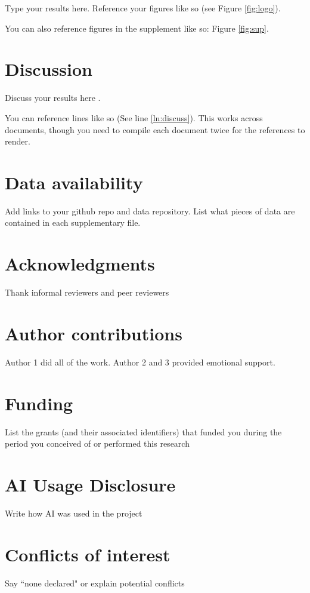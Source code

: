 \documentclass[10pt,letterpaper]{article}
\begin{document}
Type your results here. Reference your figures like so (see Figure \ref{fig:logo}).

You can also reference figures in the supplement like so: Figure \ref{fig:sup}.

\section*{Discussion}

Discuss your results here .

You can reference lines like so (See line \ref{ln:discuss}). This works across documents, though you need to compile each document twice for the references to render.

\section*{Data availability}

Add links to your github repo and data repository. List what pieces of data are contained in each supplementary file.

\section*{Acknowledgments}

Thank informal reviewers and peer reviewers

\section*{Author contributions}

Author 1 did all of the work. Author 2 and 3 provided emotional support.

\section*{Funding}

List the grants (and their associated identifiers) that funded you during the period you conceived of or performed this research

\section*{AI Usage Disclosure}

Write how AI was used in the project

\section*{Conflicts of interest}

Say ``none declared" or explain potential conflicts

\nolinenumbers




\end{document}
